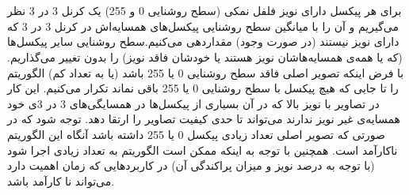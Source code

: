 \documentclass{article}
\begin{document}
\section{}%
\subsection{}
برای هر پیکسل دارای نویز فلفل نمکی (سطح روشنایی 0 و 255) یک کرنل 3 در 3 نظر می‌گیریم و آن را با میانگین سطح روشنایی پیکسل‌های همسایه‌اش در کرنل 3 در 3 که دارای نویز نیستند (در صورت وجود) مقداردهی می‌کنیم.سطح روشنایی سایر پیکسل‌ها (که یا همه‌ی همسایه‌هاشان نویز هستند یا خودشان فاقد نویز) را بدون تغییر می‌گذاریم. با فرض اینکه تصویر اصلی فاقد سطح روشنایی 0 یا 255 باشد (یا به تعداد کم) الگوریتم را تا جایی که هیچ پیکسل با سطح روشنایی 0 یا 255 باقی نماند تکرار می‌کنیم. این کار در تصاویر با نویز بالا که در آن بسیاری از پیکسل‌ها در همسایگی‌های 3 در 3ی خود همسایه‌ی غیر نویز ندارند می‌تواند تا حدی کیفیت تصاویر را ارتقا دهد. توجه شود که در صورتی که تصویر اصلی تعداد زیادی پیکسل 0 یا 255 داشته باشد آنگاه این الگوریتم ناکارآمد است. همچنین با توجه به اینکه ممکن است الگوریتم به تعداد زیادی اجرا شود (با توجه به درصد نویز و میزان پراکندگی آن) در کاربردهایی که زمان اهمیت دارد می‌تواند نا کارآمد باشد.
\subsection{}
\begin{latin}

\end{latin}

\subsection{}
\begin{latin}

\end{latin}
\end{document}
